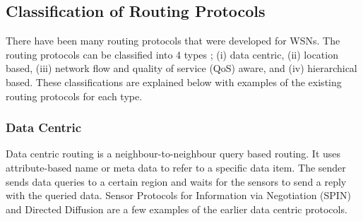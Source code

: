 \subsection{Classification of Routing Protocols}
There have been many routing protocols that were developed for WSNs. The routing protocols can be classified into 4 types \cite{akkaya2005survey}; (i) data centric, (ii) location based, (iii) network flow and quality of service (QoS) aware, and (iv) hierarchical based. These classifications are explained below with examples of the existing routing protocols for each type.



\subsubsection{Data Centric}
Data centric routing is a neighbour-to-neighbour query based routing. It uses attribute-based name or meta data to refer to a specific data item. The sender sends data queries to a certain region and waits for the sensors to send a reply with the queried data. Sensor Protocols for Information via Negotiation (SPIN) \cite{spin} and Directed Diffusion \cite{directeddiffusion} are a few examples of the earlier data centric protocols. 

